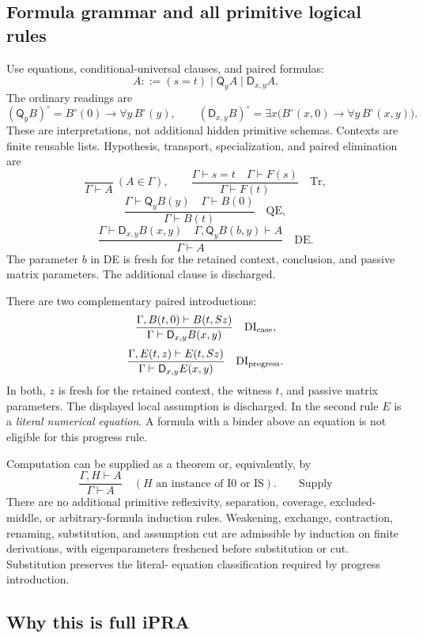 \documentclass[11pt,letterpaper]{article}
\theoremstyle{definition}\newtheorem{definition}[theorem]{Definition}
\theoremstyle{remark}\newtheorem{remark}[theorem]{Remark}
\newcommand{\D}{\mathsf D}
\newcommand{\Q}{\mathsf Q}
\begin{document}
\subsection{Formula grammar and all primitive logical rules}

Use equations, conditional-universal clauses, and paired formulas:
\[
 A::=(s=t)\mid\Q_y A\mid\D_{x,y} A.
\]
The ordinary readings are
\[
 (\Q_yB)^\circ=B^\circ(0)\to\forall y\,B^\circ(y),\qquad
 (\D_{x,y}B)^\circ=\exists x\bigl(B^\circ(x,0)\to
                         \forall y\,B^\circ(x,y)\bigr).
\]
These are interpretations, not additional hidden primitive schemas.
Contexts are finite reusable lists. Hypothesis, transport, specialization,
and paired elimination are
\[
 \frac{}{\Gamma\vdash A}\ (A\in\Gamma),\qquad
 \frac{\Gamma\vdash s=t\quad\Gamma\vdash F(s)}
      {\Gamma\vdash F(t)}\quad\mathrm{Tr},
\]
\[
 \frac{\Gamma\vdash\Q_yB(y)\quad\Gamma\vdash B(0)}
      {\Gamma\vdash B(t)}\quad\mathrm{QE},
\]
\[
 \frac{\Gamma\vdash\D_{x,y}B(x,y)\quad
       \Gamma,\Q_yB(b,y)\vdash A}
      {\Gamma\vdash A}\quad\mathrm{DE}.
\]
The parameter $b$ in DE is fresh for the retained context, conclusion,
and passive matrix parameters. The additional clause is discharged.

There are two complementary paired introductions:
\[
 \frac{\Gamma,B(t,0)\vdash B(t,Sz)}
      {\Gamma\vdash\D_{x,y}B(x,y)}\quad\mathrm{DI}_{\rm case},
\]
\[
 \frac{\Gamma,E(t,z)\vdash E(t,Sz)}
      {\Gamma\vdash\D_{x,y}E(x,y)}\quad\mathrm{DI}_{\rm progress}.
\]
In both, $z$ is fresh for the retained context, the witness $t$, and
passive matrix parameters. The displayed local assumption is discharged.
In the second rule $E$ is a \emph{literal numerical equation}. A formula
with a binder above an equation is not eligible for this progress rule.

Computation can be supplied as a theorem or, equivalently, by
\[
 \frac{\Gamma,H\vdash A}{\Gamma\vdash A}
 \quad(H\text{ an instance of I0 or IS}).\qquad\mathrm{Supply}
\]
There are no additional primitive reflexivity, separation, coverage,
excluded-middle, or arbitrary-formula induction rules. Weakening,
exchange, contraction, renaming, substitution, and assumption cut are
admissible by induction on finite derivations, with eigenparameters
freshened before substitution or cut. Substitution preserves the literal-
equation classification required by progress introduction.

\subsection{Why this is full iPRA}
\end{document}

